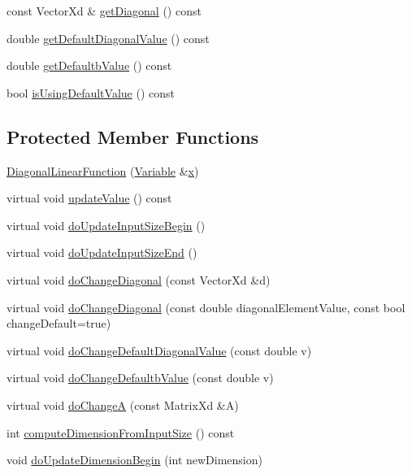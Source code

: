 {\bf }\par
\begin{DoxyCompactItemize}
\item 
const Vector\+Xd \& \hyperlink{classocra_1_1DiagonalLinearFunction_a5b6e375a522a583e7b73b3775b33f434}{get\+Diagonal} () const 
\item 
double \hyperlink{classocra_1_1DiagonalLinearFunction_ae266e9555032f4289c1927c808f861f1}{get\+Default\+Diagonal\+Value} () const 
\item 
double \hyperlink{classocra_1_1DiagonalLinearFunction_acd562e5354867c228af42c2cee62dd5b}{get\+Defaultb\+Value} () const 
\item 
bool \hyperlink{classocra_1_1DiagonalLinearFunction_a718e8f88ba78dc05c0239a88f3db8f63}{is\+Using\+Default\+Value} () const 
\end{DoxyCompactItemize}

\subsection*{Protected Member Functions}
\begin{DoxyCompactItemize}
\item 
\hyperlink{classocra_1_1DiagonalLinearFunction_ac2c460e4eedb9feba5a74ec967719654}{Diagonal\+Linear\+Function} (\hyperlink{classocra_1_1Variable}{Variable} \&\hyperlink{classocra_1_1Function_a28825886d1f149c87b112ec2ec1dd486}{x})
\item 
virtual void \hyperlink{classocra_1_1DiagonalLinearFunction_ad28c0fdaf52e0c8855c6dfce7f85f113}{update\+Value} () const 
\item 
virtual void \hyperlink{classocra_1_1DiagonalLinearFunction_a2071e4c52785c88119917460b94773cb}{do\+Update\+Input\+Size\+Begin} ()
\item 
virtual void \hyperlink{classocra_1_1DiagonalLinearFunction_a8a51d23c302c9bad9579b95e29481f55}{do\+Update\+Input\+Size\+End} ()
\item 
virtual void \hyperlink{classocra_1_1DiagonalLinearFunction_a5355515d58348a3eea92f36e35b1c7d5}{do\+Change\+Diagonal} (const Vector\+Xd \&d)
\item 
virtual void \hyperlink{classocra_1_1DiagonalLinearFunction_a0673bfe405d5637182c4749dd2737e95}{do\+Change\+Diagonal} (const double diagonal\+Element\+Value, const bool change\+Default=true)
\item 
virtual void \hyperlink{classocra_1_1DiagonalLinearFunction_a81120f5a61cc53cc940f4e71b35174ff}{do\+Change\+Default\+Diagonal\+Value} (const double v)
\item 
virtual void \hyperlink{classocra_1_1DiagonalLinearFunction_a9995af94055dc443c10018869a393635}{do\+Change\+Defaultb\+Value} (const double v)
\item 
virtual void \hyperlink{classocra_1_1DiagonalLinearFunction_addc4f984a5a71b170137788f15e2d12c}{do\+ChangeA} (const Matrix\+Xd \&A)
\item 
int \hyperlink{classocra_1_1DiagonalLinearFunction_a23095271d1e5f84774757a382f886c0a}{compute\+Dimension\+From\+Input\+Size} () const 
\item 
void \hyperlink{classocra_1_1DiagonalLinearFunction_a86b326e3578c8405806eab4ec6522ab2}{do\+Update\+Dimension\+Begin} (int new\+Dimension)
\end{DoxyCompactItemize}

